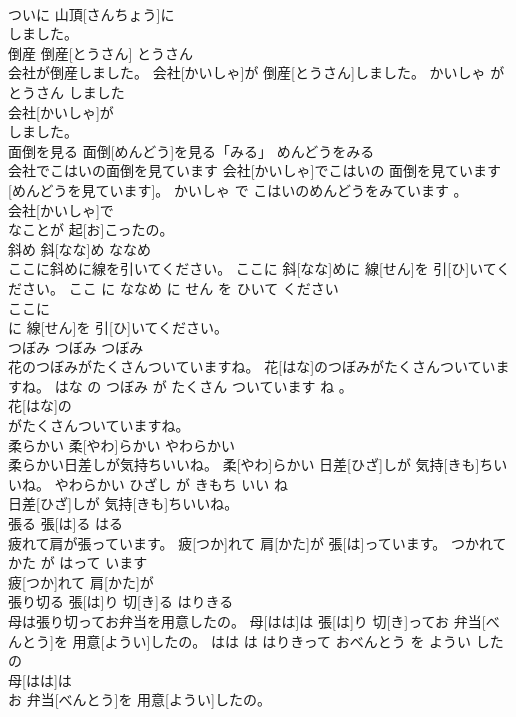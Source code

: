 \documentclass[8pt]{extreport}
\begin{document}
\begin{CJK}{UTF8}{min}
\\	ついに 山頂[さんちょう]に
\\	しました。			
\\	倒産	倒産[とうさん]	とうさん	
\\	会社が倒産しました。	会社[かいしゃ]が 倒産[とうさん]しました。	かいしゃ が とうさん しました	
\\	会社[かいしゃ]が
\\	しました。			
\\	面倒を見る	面倒[めんどう]を見る「みる」	めんどうをみる	
\\	会社でこはいの面倒を見ています	会社[かいしゃ]でこはいの 面倒を見ています[めんどうを見ています]。	かいしゃ で こはいのめんどうをみています 。	
\\	会社[かいしゃ]で
\\	なことが 起[お]こったの。			
\\	斜め	斜[なな]め	ななめ	
\\	ここに斜めに線を引いてください。	ここに 斜[なな]めに 線[せん]を 引[ひ]いてください。	ここ に ななめ に せん を ひいて ください	
\\	ここに
\\	に 線[せん]を 引[ひ]いてください。			
\\	つぼみ	つぼみ	つぼみ	
\\	花のつぼみがたくさんついていますね。	花[はな]のつぼみがたくさんついていますね。	はな の つぼみ が たくさん ついています ね 。	
\\	花[はな]の
\\	がたくさんついていますね。			
\\	柔らかい	柔[やわ]らかい	やわらかい	
\\	柔らかい日差しが気持ちいいね。	柔[やわ]らかい 日差[ひざ]しが 気持[きも]ちいいね。	やわらかい ひざし が きもち いい ね	
\\	日差[ひざ]しが 気持[きも]ちいいね。			
\\	張る	張[は]る	はる	
\\	疲れて肩が張っています。	疲[つか]れて 肩[かた]が 張[は]っています。	つかれて かた が はって います	
\\	疲[つか]れて 肩[かた]が
\\	張り切る	張[は]り 切[き]る	はりきる	
\\	母は張り切ってお弁当を用意したの。	母[はは]は 張[は]り 切[き]ってお 弁当[べんとう]を 用意[ようい]したの。	はは は はりきって おべんとう を ようい した の	
\\	母[はは]は
\\	お 弁当[べんとう]を 用意[ようい]したの。			

\end{CJK}
\end{document}
